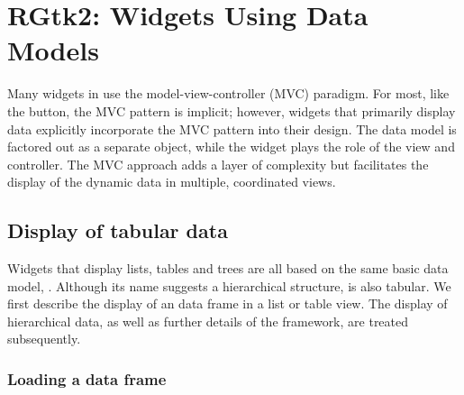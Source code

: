 
\chapter{RGtk2: Widgets Using Data Models}
\label{sec:RGtk2:widgets-with-models}



Many widgets in \GTK\/ use the model-view-controller (MVC)
paradigm. For most, like the button, the MVC pattern is implicit;
however, widgets that primarily display data explicitly incorporate
the MVC pattern into their design. The data model is factored out as a
separate object, while the widget plays the role of the view and
controller. The MVC approach adds a layer of complexity but
facilitates the display of the dynamic data in multiple, coordinated
views.

\section{Display of tabular data}
\label{sec:RGtk2:tabular-heirarchical-data}

Widgets that display lists, tables and trees are all based on the same
basic data model, . Although its name suggests a
hierarchical structure,  is also tabular. We first
describe the display of an \R\/ data frame in a list or table
view. The display of hierarchical data, as well as further details of
the  framework, are treated subsequently.

\subsection{Loading a data frame}
\label{sec:tabular-stores-tree}

